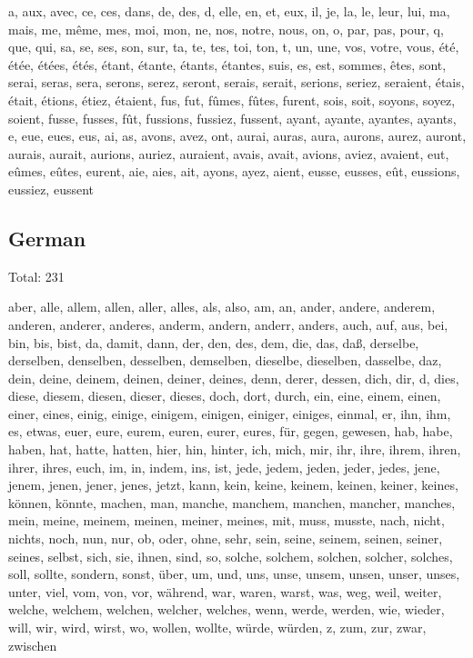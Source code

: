 a, aux, avec, ce, ces, dans, de, des, d, elle, en, et, eux, il, je, la, le, leur, lui, ma, mais, me, m{\^e}me, mes, moi, mon, ne, nos, notre, nous, on, o, par, pas, pour, q, que, qui, sa, se, ses, son, sur, ta, te, tes, toi, ton, t, un, une, vos, votre, vous, {\'e}t{\'e}, {\'e}t{\'e}e, {\'e}t{\'e}es, {\'e}t{\'e}s, {\'e}tant, {\'e}tante, {\'e}tants, {\'e}tantes, suis, es, est, sommes, {\^e}tes, sont, serai, seras, sera, serons, serez, seront, serais, serait, serions, seriez, seraient, {\'e}tais, {\'e}tait, {\'e}tions, {\'e}tiez, {\'e}taient, fus, fut, f{\^u}mes, f{\^u}tes, furent, sois, soit, soyons, soyez, soient, fusse, fusses, f{\^u}t, fussions, fussiez, fussent, ayant, ayante, ayantes, ayants, e, eue, eues, eus, ai, as, avons, avez, ont, aurai, auras, aura, aurons, aurez, auront, aurais, aurait, aurions, auriez, auraient, avais, avait, avions, aviez, avaient, eut, e{\^u}mes, e{\^u}tes, eurent, aie, aies, ait, ayons, ayez, aient, eusse, eusses, e{\^u}t, eussions, eussiez, eussent

\subsection{German}

Total: 231

aber, alle, allem, allen, aller, alles, als, also, am, an, ander, andere, anderem, anderen, anderer, anderes, anderm, andern, anderr, anders, auch, auf, aus, bei, bin, bis, bist, da, damit, dann, der, den, des, dem, die, das, da{\ss}, derselbe, derselben, denselben, desselben, demselben, dieselbe, dieselben, dasselbe, daz, dein, deine, deinem, deinen, deiner, deines, denn, derer, dessen, dich, dir, d, dies, diese, diesem, diesen, dieser, dieses, doch, dort, durch, ein, eine, einem, einen, einer, eines, einig, einige, einigem, einigen, einiger, einiges, einmal, er, ihn, ihm, es, etwas, euer, eure, eurem, euren, eurer, eures, f{\"u}r, gegen, gewesen, hab, habe, haben, hat, hatte, hatten, hier, hin, hinter, ich, mich, mir, ihr, ihre, ihrem, ihren, ihrer, ihres, euch, im, in, indem, ins, ist, jede, jedem, jeden, jeder, jedes, jene, jenem, jenen, jener, jenes, jetzt, kann, kein, keine, keinem, keinen, keiner, keines, k{\"o}nnen, k{\"o}nnte, machen, man, manche, manchem, manchen, mancher, manches, mein, meine, meinem, meinen, meiner, meines, mit, muss, musste, nach, nicht, nichts, noch, nun, nur, ob, oder, ohne, sehr, sein, seine, seinem, seinen, seiner, seines, selbst, sich, sie, ihnen, sind, so, solche, solchem, solchen, solcher, solches, soll, sollte, sondern, sonst, {\"u}ber, um, und, uns, unse, unsem, unsen, unser, unses, unter, viel, vom, von, vor, w{\"a}hrend, war, waren, warst, was, weg, weil, weiter, welche, welchem, welchen, welcher, welches, wenn, werde, werden, wie, wieder, will, wir, wird, wirst, wo, wollen, wollte, w{\"u}rde, w{\"u}rden, z, zum, zur, zwar, zwischen



